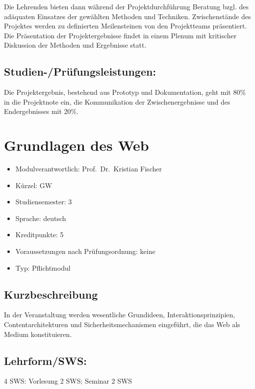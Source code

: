 Die Lehrenden bieten dann während der Projektdurchführung Beratung bzgl.
des adäquaten Einsatzes der gewählten Methoden und Techniken.
Zwischenstände des Projektes werden zu definierten Meilensteinen von den
Projektteams präsentiert. Die Präsentation der Projektergebnisse findet
in einem Plenum mit kritischer Diskussion der Methoden und Ergebnisse
statt.

\section*{Studien-/Prüfungsleistungen:}\label{studien-pruxfcfungsleistungen-9}

Die Projektergebnis, bestehend aus Prototyp und Dokumentation, geht mit
80\% in die Projektnote ein, die Kommunikation der Zwischenergebnisse
und des Endergebnisses mit 20\%.

\chapter{Grundlagen des Web}\label{grundlagen-des-web}

\begin{itemize}
\tightlist
\item
  Modulverantwortlich: Prof.~Dr.~Kristian Fischer
\item
  Kürzel: GW
\item
  Studiensemester: 3
\item
  Sprache: deutsch
\item
  Kreditpunkte: 5
\item
  Voraussetzungen nach Prüfungsordnung: keine
\item
  Typ: Pflichtmodul
\end{itemize}

\section*{Kurzbeschreibung}\label{kurzbeschreibung-1}

In der Veranstaltung werden wesentliche Grundideen,
Interaktionsprinzipien, Contentarchitekturen und Sicherheitsmechanismen
eingeführt, die das Web als Medium konstituieren.

\section*{Lehrform/SWS:}\label{lehrformsws-11}

4 SWS: Vorlesung 2 SWS; Seminar 2 SWS

